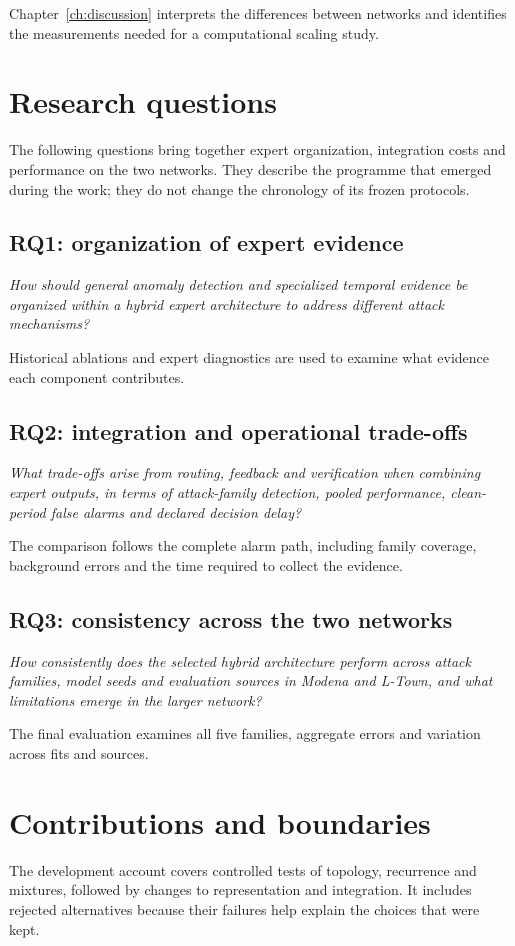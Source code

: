 Chapter~\ref{ch:discussion} interprets the differences between networks and identifies the measurements needed for a computational scaling study.

\section{Research questions}
The following questions bring together expert organization, integration costs and performance on the two networks. They describe the programme that emerged during the work; they do not change the chronology of its frozen protocols.

\subsection{RQ1: organization of expert evidence}
\textit{How should general anomaly detection and specialized temporal evidence be organized within a hybrid expert architecture to address different attack mechanisms?}

Historical ablations and expert diagnostics are used to examine what evidence each component contributes.

\subsection{RQ2: integration and operational trade-offs}
\textit{What trade-offs arise from routing, feedback and verification when combining expert outputs, in terms of attack-family detection, pooled performance, clean-period false alarms and declared decision delay?}

The comparison follows the complete alarm path, including family coverage, background errors and the time required to collect the evidence.

\subsection{RQ3: consistency across the two networks}
\textit{How consistently does the selected hybrid architecture perform across attack families, model seeds and evaluation sources in Modena and L-Town, and what limitations emerge in the larger network?}

The final evaluation examines all five families, aggregate errors and variation across fits and sources.

\section{Contributions and boundaries}
The development account covers controlled tests of topology, recurrence and mixtures, followed by changes to representation and integration. It includes rejected alternatives because their failures help explain the choices that were kept.

